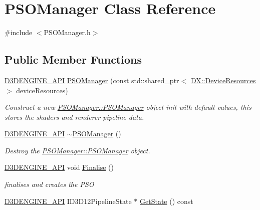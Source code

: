 \hypertarget{class_p_s_o_manager}{}\section{P\+S\+O\+Manager Class Reference}
\label{class_p_s_o_manager}


{\ttfamily \#include $<$P\+S\+O\+Manager.\+h$>$}

\subsection*{Public Member Functions}
\begin{DoxyCompactItemize}
\item 
\mbox{\hyperlink{stdafx_8h_a8ee2d990c5dfba7794dd2b60741d7722}{D3\+D\+E\+N\+G\+I\+N\+E\+\_\+\+A\+PI}} \mbox{\hyperlink{class_p_s_o_manager_a0ada0797c36bd51e30d46af47e2785a3}{P\+S\+O\+Manager}} (const std\+::shared\+\_\+ptr$<$ \mbox{\hyperlink{class_d_x_1_1_device_resources}{D\+X\+::\+Device\+Resources}} $>$ device\+Resources)
\begin{DoxyCompactList}\small\item\em Construct a new \mbox{\hyperlink{class_p_s_o_manager_a0ada0797c36bd51e30d46af47e2785a3}{P\+S\+O\+Manager\+::\+P\+S\+O\+Manager}} object init with default values, this stores the shaders and renderer pipeline data. \end{DoxyCompactList}\item 
\mbox{\hyperlink{stdafx_8h_a8ee2d990c5dfba7794dd2b60741d7722}{D3\+D\+E\+N\+G\+I\+N\+E\+\_\+\+A\+PI}} \mbox{\hyperlink{class_p_s_o_manager_a4f35a02a56881d6624f36c916d4dface}{$\sim$\+P\+S\+O\+Manager}} ()
\begin{DoxyCompactList}\small\item\em Destroy the \mbox{\hyperlink{class_p_s_o_manager_a0ada0797c36bd51e30d46af47e2785a3}{P\+S\+O\+Manager\+::\+P\+S\+O\+Manager}} object. \end{DoxyCompactList}\item 
\mbox{\hyperlink{stdafx_8h_a8ee2d990c5dfba7794dd2b60741d7722}{D3\+D\+E\+N\+G\+I\+N\+E\+\_\+\+A\+PI}} void \mbox{\hyperlink{class_p_s_o_manager_ad8091fe85d4e765ad6c979f891bc053b}{Finalise}} ()
\begin{DoxyCompactList}\small\item\em finalises and creates the P\+SO \end{DoxyCompactList}\item 
\mbox{\hyperlink{stdafx_8h_a8ee2d990c5dfba7794dd2b60741d7722}{D3\+D\+E\+N\+G\+I\+N\+E\+\_\+\+A\+PI}} I\+D3\+D12\+Pipeline\+State $\ast$ \mbox{\hyperlink{class_p_s_o_manager_ab635262aed53ba34b91ae15224808254}{Get\+State}} () const

\end{DoxyCompactItemize}
